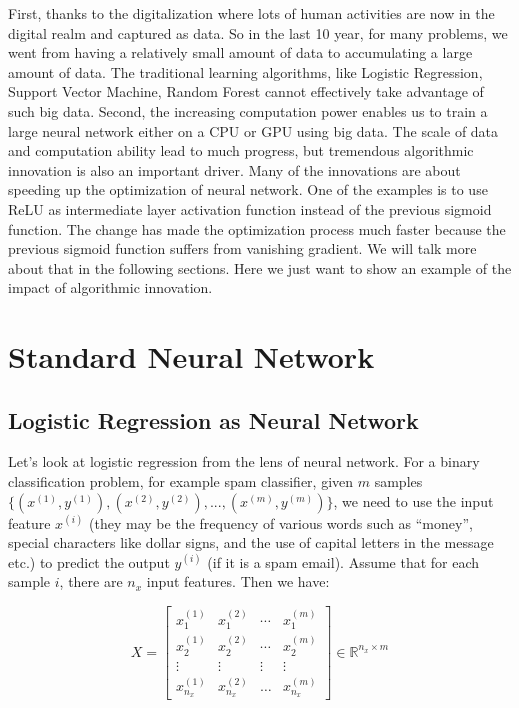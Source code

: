 \documentclass[12pt,]{krantz}
\theoremstyle{definition}
\theoremstyle{definition}
\theoremstyle{definition}
\theoremstyle{remark}
\begin{document}
First, thanks to the digitalization where lots of human activities are
now in the digital realm and captured as data. So in the last 10 year,
for many problems, we went from having a relatively small amount of data
to accumulating a large amount of data. The traditional learning
algorithms, like Logistic Regression, Support Vector Machine, Random
Forest cannot effectively take advantage of such big data. Second, the
increasing computation power enables us to train a large neural network
either on a CPU or GPU using big data. The scale of data and computation
ability lead to much progress, but tremendous algorithmic innovation is
also an important driver. Many of the innovations are about speeding up
the optimization of neural network. One of the examples is to use ReLU
as intermediate layer activation function instead of the previous
sigmoid function. The change has made the optimization process much
faster because the previous sigmoid function suffers from vanishing
gradient. We will talk more about that in the following sections. Here
we just want to show an example of the impact of algorithmic innovation.

\section{Standard Neural Network}\label{standard-neural-network}

\subsection{Logistic Regression as Neural
Network}\label{logistic_reg_as_neural_network}

Let's look at logistic regression from the lens of neural network. For a
binary classification problem, for example spam classifier, given \(m\)
samples
\(\{(x^{(1)}, y^{(1)}),(x^{(2)}, y^{(2)}),...,(x^{(m)}, y^{(m)})\}\), we
need to use the input feature \(x^{(i)}\) (they may be the frequency of
various words such as ``money'', special characters like dollar signs,
and the use of capital letters in the message etc.) to predict the
output \(y^{(i)}\) (if it is a spam email). Assume that for each sample
\(i\), there are \(n_{x}\) input features. Then we have:

\begin{equation}
X=\left[\begin{array}{cccc}
x_{1}^{(1)} & x_{1}^{(2)} & \dotsb & x_{1}^{(m)}\\
x_{2}^{(1)} & x_{2}^{(2)} & \dotsb & x_{2}^{(m)}\\
\vdots & \vdots & \vdots & \vdots\\
x_{n_{x}}^{(1)} & x_{n_{x}}^{(2)} & \dots & x_{n_{x}}^{(m)}
\end{array}\right]\in\mathbb{R}^{n_{x}\times m}
\label{eq:input}
\end{equation}
\end{document}
